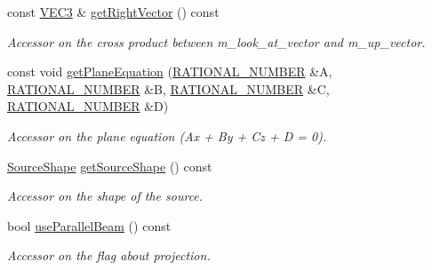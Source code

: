 \begin{DoxyCompactItemize}
const \hyperlink{class_math_1_1_vec3}{VEC3} \& \hyperlink{classg_virtual_x_ray_1_1_x_ray_detector_ad0d1e7a338d175c1194c7be9c15f5453}{getRightVector} () const 
\begin{DoxyCompactList}\small\item\em Accessor on the cross product between m\_\-look\_\-at\_\-vector and m\_\-up\_\-vector. \end{DoxyCompactList}\item 
const void \hyperlink{classg_virtual_x_ray_1_1_x_ray_detector_abd408fcf45d19386de9c0ef749b9d66e}{getPlaneEquation} (\hyperlink{namespace_utilities_a40969b96bd8d847b962e297cb79f08ce}{RATIONAL\_\-NUMBER} \&A, \hyperlink{namespace_utilities_a40969b96bd8d847b962e297cb79f08ce}{RATIONAL\_\-NUMBER} \&B, \hyperlink{namespace_utilities_a40969b96bd8d847b962e297cb79f08ce}{RATIONAL\_\-NUMBER} \&C, \hyperlink{namespace_utilities_a40969b96bd8d847b962e297cb79f08ce}{RATIONAL\_\-NUMBER} \&D)
\begin{DoxyCompactList}\small\item\em Accessor on the plane equation (Ax + By + Cz + D = 0). \end{DoxyCompactList}\item 
\hyperlink{classg_virtual_x_ray_1_1_x_ray_detector_a217628a4ed1ca8ed8031b288fb09d335}{SourceShape} \hyperlink{classg_virtual_x_ray_1_1_x_ray_detector_a8d9cd9cbe4dde868a076a1ec1aa30716}{getSourceShape} () const 
\begin{DoxyCompactList}\small\item\em Accessor on the shape of the source. \end{DoxyCompactList}\item 
bool \hyperlink{classg_virtual_x_ray_1_1_x_ray_detector_a00d1e230285e636afdb7a0321f2514de}{useParallelBeam} () const 
\begin{DoxyCompactList}\small\item\em Accessor on the flag about projection. \end{DoxyCompactList}\end{DoxyCompactItemize}
